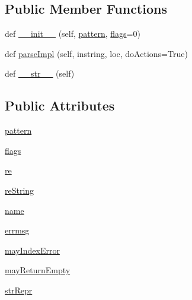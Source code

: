 \subsection*{Public Member Functions}
\begin{DoxyCompactItemize}
\item 
def \hyperlink{classpkg__resources_1_1__vendor_1_1pyparsing_1_1Regex_a344d143fdcdc1ff4aef98404422781f1}{\+\_\+\+\_\+init\+\_\+\+\_\+} (self, \hyperlink{classpkg__resources_1_1__vendor_1_1pyparsing_1_1Regex_a668261616fecfa783128d422936c5822}{pattern}, \hyperlink{classpkg__resources_1_1__vendor_1_1pyparsing_1_1Regex_a438ead3932bb9a1d00342361d6ec727b}{flags}=0)
\item 
def \hyperlink{classpkg__resources_1_1__vendor_1_1pyparsing_1_1Regex_af18815c256629aaf99e23f3cbf1bb90c}{parse\+Impl} (self, instring, loc, do\+Actions=True)
\item 
def \hyperlink{classpkg__resources_1_1__vendor_1_1pyparsing_1_1Regex_aaccca833661bfd93cd288838783438f6}{\+\_\+\+\_\+str\+\_\+\+\_\+} (self)
\end{DoxyCompactItemize}
\subsection*{Public Attributes}
\begin{DoxyCompactItemize}
\item 
\hyperlink{classpkg__resources_1_1__vendor_1_1pyparsing_1_1Regex_a668261616fecfa783128d422936c5822}{pattern}
\item 
\hyperlink{classpkg__resources_1_1__vendor_1_1pyparsing_1_1Regex_a438ead3932bb9a1d00342361d6ec727b}{flags}
\item 
\hyperlink{classpkg__resources_1_1__vendor_1_1pyparsing_1_1Regex_aae387dae124bc460ef7bba1f12628136}{re}
\item 
\hyperlink{classpkg__resources_1_1__vendor_1_1pyparsing_1_1Regex_a16b354129ae1d3bf6bd74cf36da30194}{re\+String}
\item 
\hyperlink{classpkg__resources_1_1__vendor_1_1pyparsing_1_1Regex_a139cd5bc18957e505678b78632fa60c5}{name}
\item 
\hyperlink{classpkg__resources_1_1__vendor_1_1pyparsing_1_1Regex_a94cb2e44d62f673392540af4809d8626}{errmsg}
\item 
\hyperlink{classpkg__resources_1_1__vendor_1_1pyparsing_1_1Regex_a1eaa09ac3af53d744f5c7ca94e5c852d}{may\+Index\+Error}
\item 
\hyperlink{classpkg__resources_1_1__vendor_1_1pyparsing_1_1Regex_ad6d563920c30c08162bacb9e3fc6f812}{may\+Return\+Empty}
\item 
\hyperlink{classpkg__resources_1_1__vendor_1_1pyparsing_1_1Regex_a010942a4fcef59631b098f59d26aaeba}{str\+Repr}
\end{DoxyCompactItemize}
